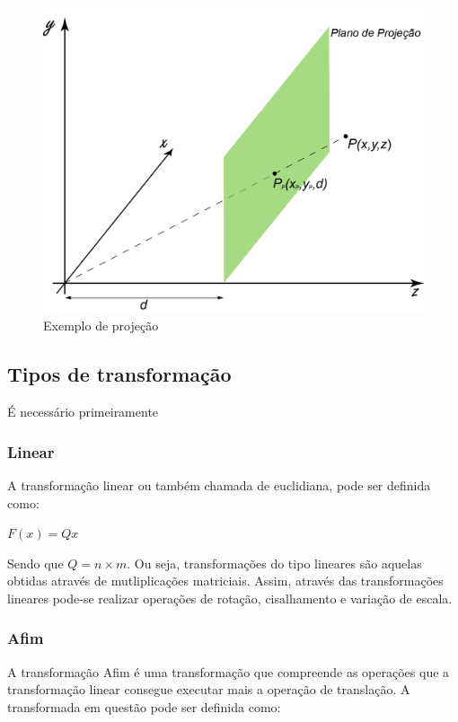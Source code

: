 \documentclass[9pt, a4paper, nofonttune, journal]{IEEEtran}
\begin{document}
\begin{figure}[H] 
\begin{center}
\includegraphics[scale=0.25]{figuras/projection1}
\caption{Exemplo de projeção}
\end{center}
\end{figure}


\subsection{Tipos de transformação}
É necessário primeiramente 
\subsubsection{Linear}
A transformação linear ou também chamada de euclidiana, pode ser definida como:
\begin{center}
$F(x)=Qx$\end{center}
Sendo que $Q=n\times m$.
Ou seja, transformações do tipo lineares são aquelas obtidas através de mutliplicações matriciais.
Assim, através das transformações lineares pode-se realizar operações de rotação, cisalhamento e variação de escala.\cite{CGPPBook1}


\subsubsection{Afim}
A transformação Afim é uma transformação que compreende as operações que a transformação linear
consegue executar mais a operação de translação. A transformada em questão pode ser definida como:
\end{document}
